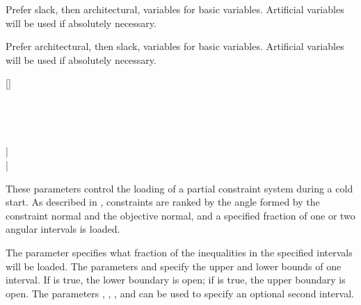 \begin{codedoc}
\begin{description}[2 (\kw{architectural})]
    \item[1 (\kw{slack})] Prefer slack, then architectural, variables for
    basic variables.
    Artificial variables will be used if absolutely necessary.

    \item[2 (\kw{architectural})] Prefer architectural, then slack, variables
    for basic variables.
    Artificial variables will be used if absolutely necessary.
  \end{description}

  \item{}
  \bgroup \raggedright
   [] 
     \kw{;} \\
   \bnfeq {} \\
   \bnfeq {}    \\
   \bnfeq {} \\
   \bnfeq {} \\
   \bnfeq \kw{(} | \kw{[} \\
   \bnfeq \kw{)} | \kw{]}
  \egroup

  These parameters control the loading of a partial constraint system during
  a cold start.
  As described in , constraints are ranked by the angle
  formed by the constraint normal and the objective normal, and a specified
  fraction of one or two angular intervals is loaded.

  The parameter  specifies what fraction of the inequalities
  in the specified intervals will be loaded.
  The parameters  and  specify the upper and lower bounds
  of one interval.
  If  is true, the lower boundary is open; if  is
  true, the upper boundary is open.
  The parameters , , , and 
  can be used to specify an optional second interval.


\end{codedoc}
